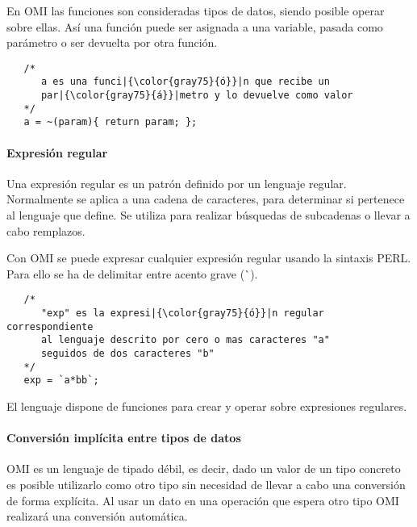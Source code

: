 En OMI las funciones son consideradas tipos de datos, siendo posible operar sobre ellas. Así una función puede ser asignada a una variable, pasada como parámetro 
o ser devuelta por otra función. \\

\begin{lstlisting}
   /*
      a es una funci|{\color{gray75}{ó}}|n que recibe un 
      par|{\color{gray75}{á}}|metro y lo devuelve como valor
   */
   a = ~(param){ return param; }; 
\end{lstlisting} 



\paragraph{Expresión regular}
Una expresión regular es un patrón definido por un lenguaje regular. Normalmente se aplica a una cadena de caracteres, para 
determinar si pertenece al lenguaje que define. Se utiliza para realizar búsquedas de subcadenas o llevar a cabo remplazos.

Con OMI se puede expresar cualquier expresión regular usando la sintaxis PERL. Para ello se ha de delimitar entre acento grave (\`\ ). \\

\begin{lstlisting}
   /*
      "exp" es la expresi|{\color{gray75}{ó}}|n regular correspondiente
      al lenguaje descrito por cero o mas caracteres "a" 
      seguidos de dos caracteres "b"
   */
   exp = `a*bb`; 
\end{lstlisting} 

El lenguaje dispone de funciones para crear y operar sobre expresiones regulares.


\paragraph{Conversión implícita entre tipos de datos}\label{sec:type_iconv}
OMI es un lenguaje de tipado débil, es decir, dado un valor de un tipo concreto es posible utilizarlo como otro tipo sin necesidad de 
llevar a cabo una conversión de forma explícita. Al usar un dato en una operación que espera  otro tipo OMI realizará
una conversión automática.




